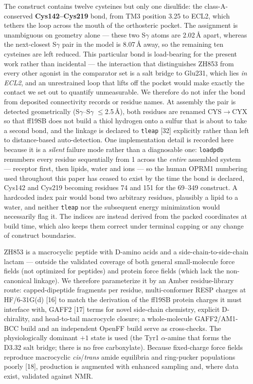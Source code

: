 \documentclass[11pt]{article}
\newcommand{\Ang}{\AA}
\newcommand{\lteq}{$\le$}
\newcommand{\ra}{$\rightarrow$}
\begin{document}
The construct contains twelve cysteines but only one disulfide: the class-A-conserved
\textbf{Cys142--Cys219} bond, from TM3 position 3.25 to ECL2, which tethers the loop across the mouth
of the orthosteric pocket. The assignment is unambiguous on geometry alone --- these two S$\gamma$
atoms are 2.02\,\Ang{} apart, whereas the next-closest S$\gamma$ pair in the model is 8.07\,\Ang{}
away, so the remaining ten cysteines are
left reduced. This particular bond is load-bearing for the present work rather than incidental --- the
interaction that distinguishes ZH853 from every other agonist in the comparator set is a salt bridge to
Glu231, which lies \emph{in ECL2}, and an unrestrained loop that lifts off the pocket would make exactly
the contact we set out to quantify unmeasurable. We therefore do not infer the bond from deposited
connectivity records or residue names. At assembly the pair is detected geometrically
(S$\gamma$--S$\gamma$ \lteq2.5\,\Ang), both residues are renamed CYS\ra CYX so that ff19SB does not
build a thiol hydrogen onto a sulfur that is about to take a second bond, and the linkage is declared
to \texttt{tleap} [32] explicitly rather than left to distance-based auto-detection. One implementation
detail is recorded here because it is a \emph{silent} failure mode rather than a diagnosable one:
\texttt{loadpdb} renumbers every residue sequentially from 1 across the \emph{entire} assembled system
--- receptor first, then lipids, water and ions --- so the human OPRM1 numbering used throughout this
paper has ceased to exist by the time the bond is declared, Cys142 and Cys219 becoming residues 74 and
151 for the 69--349 construct. A hardcoded index pair would bond two arbitrary residues, plausibly a
lipid to a water, and neither \texttt{tleap} nor the subsequent energy minimization would necessarily
flag it. The indices are instead derived from the packed coordinates at build time, which also keeps
them correct under terminal capping or any change of construct boundaries.

ZH853 is a macrocyclic peptide with D-amino acids and a
side-chain-to-side-chain lactam --- outside the validated coverage of both general small-molecule force
fields (not optimized for peptides) and protein force fields (which lack the non-canonical linkage). We
therefore parameterize it by an Amber residue-library route: capped-dipeptide fragments per residue,
multi-conformer RESP charges at HF/6-31G(d) [16] to match the derivation of the ff19SB
protein charges it must interface with, GAFF2 [17] terms for novel side-chain chemistry,
explicit D-chirality, and head-to-tail macrocycle closure; a whole-molecule GAFF2/AM1-BCC build and an
independent OpenFF build serve as cross-checks. The physiologically dominant $+1$ state is used (the
Tyr1 $\alpha$-amine that forms the D3.32 salt bridge; there is no free carboxylate). Because fixed-charge
force fields reproduce macrocyclic \emph{cis}/\emph{trans} amide equilibria and ring-pucker populations
poorly [18], production is augmented with enhanced sampling and, where data exist,
validated against NMR.
\end{document}

